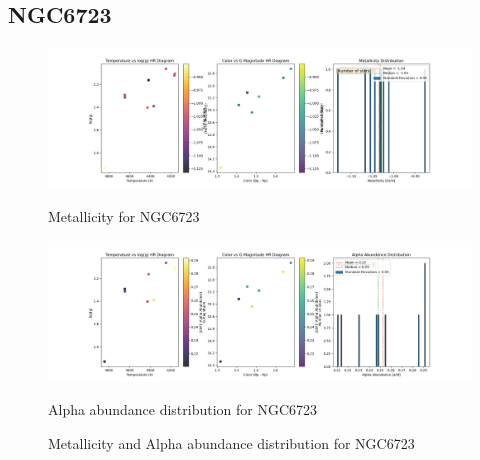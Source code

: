 \documentclass[a4paper,12pt]{article}
\begin{document}
\subsection{NGC6723}
\begin{figure}[H]
    \centering
    \begin{minipage}[b]{0.8\textwidth}
        \centering
        \includegraphics[width=\textwidth]{NGC6723_metalicity.png}
        \caption{Metallicity for NGC6723}
        \label{fig:NGC6723_metalicity}
    \end{minipage}
    \hfill
    \begin{minipage}[b]{0.8\textwidth}
        \centering
        \includegraphics[width=\textwidth]{NGC6723_alpha.png}
        \caption{Alpha abundance distribution for NGC6723}
        \label{fig:NGC6723_alpha}
    \end{minipage}
    \caption{Metallicity and Alpha abundance distribution for NGC6723}
    \label{fig:NGC6723_combined}
\end{figure}
\clearpage
\end{document}
